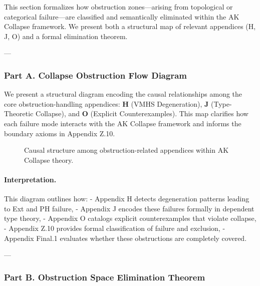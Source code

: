 \documentclass[11pt]{article}
\begin{document}
\begin{axiom}
\begin{axiom}
{{This section formalizes how obstruction zones—arising from topological or categorical failure—are classified and semantically eliminated within the AK Collapse framework.  
We present both a structural map of relevant appendices (H, J, O) and a formal elimination theorem.

---

\subsubsection*{Part A. Collapse Obstruction Flow Diagram}

We present a structural diagram encoding the causal relationships among the core obstruction-handling appendices:  
\textbf{H} (VMHS Degeneration), \textbf{J} (Type-Theoretic Collapse), and \textbf{O} (Explicit Counterexamples).  
This map clarifies how each failure mode interacts with the AK Collapse framework and informs the boundary axioms in Appendix Z.10.

\begin{figure}[H]
\centering
{}
\caption{Causal structure among obstruction-related appendices within AK Collapse theory.}
\end{figure}

\paragraph{Interpretation.}
This diagram outlines how:
- Appendix H detects degeneration patterns leading to Ext and PH failure,
- Appendix J encodes these failures formally in dependent type theory,
- Appendix O catalogs explicit counterexamples that violate collapse,
- Appendix Z.10 provides formal classification of failure and exclusion,
- Appendix Final.1 evaluates whether these obstructions are completely covered.

---

\subsubsection*{Part B. Obstruction Space Elimination Theorem}

}}
\end{axiom}
\end{axiom}
\end{document}
